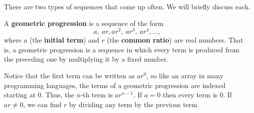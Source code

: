 %
%
%
%

There are two types of sequences that come up often.  We will briefly discuss each.

\begin{df}
A {\bf geometric progression} is a sequence of the form
$$ a, \ ar, ar^2,\ ar^3, \ ar^4, \ldots,$$
where $a$ (the {\bf initial term}) and $r$ (the {\bf common ratio}) are real numbers.
That is, a geometric progression is a sequence in which every term is
produced from the preceding one by multiplying it by a fixed number.
\end{df}

Notice that the first term can be written as $ar^0$, so like an array in many programming languages, the terms of a geometric progression 
are indexed starting at $0$. Thus, the $n$-th term is $ar^{n-1}$.
If $a=0$ then every term is $0$.
If $a r\neq 0$, we can find $r$ by dividing any term by the previous term.

